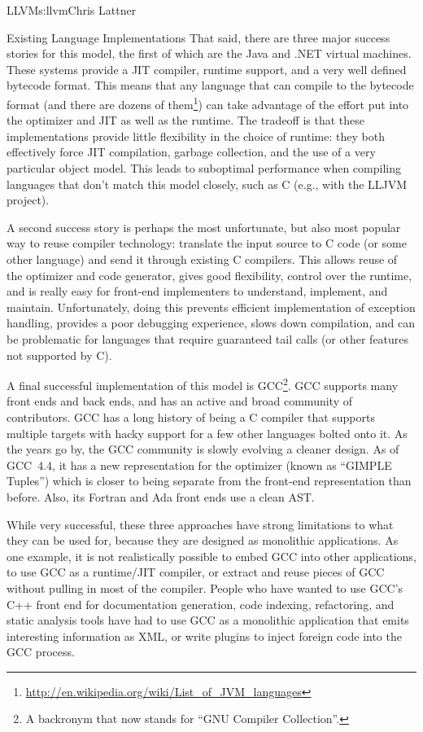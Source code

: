 \begin{aosachapter}{LLVM}{s:llvm}{Chris Lattner}
\begin{aosasect1}{Existing Language Implementations}
That said, there are three major success stories for this model, the
first of which are the Java and .NET virtual machines.  These systems
provide a JIT compiler, runtime support, and a very well defined
bytecode format.  This means that any language that can compile to the
bytecode format (and there are dozens of
them\footnote{\url{http://en.wikipedia.org/wiki/List_of_JVM_languages}})
can take advantage of the effort put into the optimizer and JIT as
well as the runtime.  The tradeoff is that these implementations
provide little flexibility in the choice of runtime: they both
effectively force JIT compilation, garbage collection, and the use of
a very particular object model.  This leads to suboptimal performance
when compiling languages that don't match this model closely, such as
C (e.g., with the LLJVM project).

A second success story is perhaps the most unfortunate, but
also most popular way to reuse compiler technology: translate the input
source to C code (or some other language) and send it through existing
C compilers.  This allows reuse of the optimizer and code generator,
gives good flexibility, control over the runtime, and is really easy
for front-end implementers to understand, implement, and maintain.
Unfortunately, doing this prevents efficient implementation of
exception handling, provides a poor debugging experience, slows down
compilation, and can be problematic for languages that require guaranteed
tail calls (or other features not supported by C).

A final successful implementation of this model is GCC\footnote{A
backronym that now stands for ``GNU Compiler Collection''.}.  GCC
supports many front ends and back ends, and has an active and broad
community of contributors.  GCC has a long history of being a C
compiler that supports multiple targets with hacky support for a few
other languages bolted onto it.  As the years go by, the GCC community
is slowly evolving a cleaner design.  As of GCC~4.4, it has a new
representation for the optimizer (known as ``GIMPLE Tuples'') which is
closer to being separate from the front-end representation than
before.  Also, its Fortran and Ada front ends use a clean AST.

While very successful, these three approaches have strong limitations
to what they can be used for, because they are designed as monolithic
applications.  As one example, it is not realistically possible to
embed GCC into other applications, to use GCC as a runtime/JIT
compiler, or extract and reuse pieces of GCC without pulling in most
of the compiler.  People who have wanted to use GCC's C++ front end for
documentation generation, code indexing, refactoring, and static
analysis tools have had to use GCC as a monolithic application that
emits interesting information as XML, or write plugins to inject
foreign code into the GCC process.


\end{aosasect1}
\end{aosachapter}
